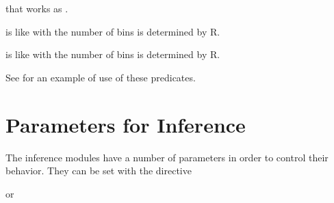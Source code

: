 \documentclass[letterpaper,10pt,english]{sphinxmanual}
\begin{document}
\sphinxAtStartPar
that works as .

\begin{sphinxVerbatim}[commandchars=\\\{\}]
  
\end{sphinxVerbatim}

\sphinxAtStartPar
is like  with the number of bins is determined by R.

\begin{sphinxVerbatim}[commandchars=\\\{\}]
  
\end{sphinxVerbatim}

\sphinxAtStartPar
is like  with the number of bins is determined by R.

\sphinxAtStartPar
See  for an example of use of these predicates.


\section{Parameters for Inference}
\label{\detokenize{index:parameters-for-inference}}
\sphinxAtStartPar
The inference modules have a number of parameters in order to control their behavior.
They can be set with the directive

\begin{sphinxVerbatim}[commandchars=\\\{\}]
 
\end{sphinxVerbatim}

\sphinxAtStartPar
or

\begin{sphinxVerbatim}[commandchars=\\\{\}]
 
\end{sphinxVerbatim}
\end{document}
